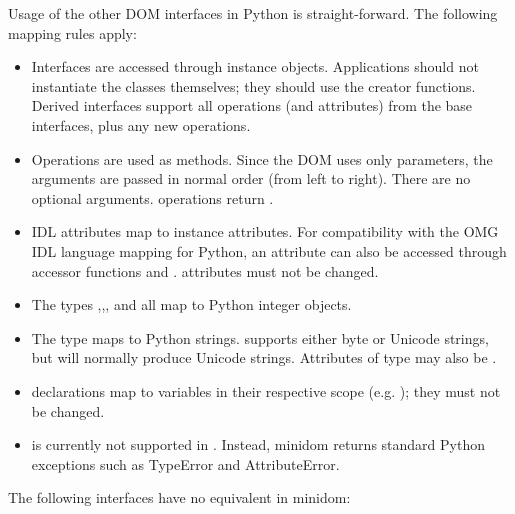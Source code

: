 Usage of the other DOM interfaces in Python is straight-forward. The
following mapping rules apply:

\begin{itemize}

\item Interfaces are accessed through instance objects. Applications
should
not instantiate the classes themselves; they should use the creator
functions. Derived interfaces support all operations (and attributes) 
from the base interfaces, plus any new operations.

\item Operations are used as methods. Since the DOM uses only
parameters, the arguments are passed in normal order (from left to
right). 
There are no optional arguments.  operations return
.

\item IDL attributes map to instance attributes. For compatibility
with
the OMG IDL language mapping for Python, an attribute  can
also be accessed through accessor functions  and
.  attributes must not be changed.

\item The types ,,,
and  all map to Python integer objects.

\item The type  maps to Python strings. 
supports either byte or Unicode strings, but will normally produce
Unicode
strings. Attributes of type  may also be .

\item {} declarations map to variables in their respective
scope
(e.g. ); they
must
not be changed.

\item {} is currently not supported in
. Instead, minidom returns standard Python exceptions
such as TypeError and AttributeError.

\end{itemize}

The following interfaces have no equivalent in minidom:

